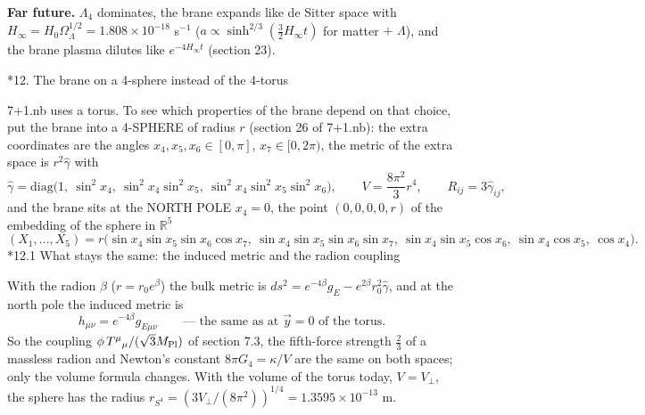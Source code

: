 \documentclass[10pt,a4paper]{article}
\makeatletter
\renewcommand\section{\@startsection{section}{1}{\z@}{-3.5ex \@plus -1ex \@minus -.2ex}{2.3ex \@plus.2ex}{\normalfont\Large\bfseries\raggedright}}
\renewcommand\subsection{\@startsection{subsection}{2}{\z@}{-3.25ex\@plus -1ex \@minus -.2ex}{1.5ex \@plus .2ex}{\normalfont\large\bfseries\raggedright}}
\makeatother
\begin{document}
\textbf{Far future.} $\Lambda_4$ dominates, the brane expands like de Sitter space with $H_\infty=H_0\Omega_\Lambda^{1/2}=1.808\times10^{-18}$ s$^{-1}$ ($a\propto\sinh^{2/3}(\frac32H_\infty t)$ for matter $+$ $\Lambda$), and the brane plasma dilutes like $e^{-4H_\infty t}$ (section 23).

\section*{12. The brane on a 4-sphere instead of the 4-torus}
7+1.nb uses a torus. To see which properties of the brane depend on that choice, put the brane into a 4-SPHERE of radius $r$ (section 26 of 7+1.nb): the extra coordinates are the angles $x_4,x_5,x_6\in[0,\pi]$, $x_7\in[0,2\pi)$, the metric of the extra space is $r^2\hat\gamma$ with
\begin{equation*}
\hat\gamma=\mathrm{diag}\big(1,\ \sin^2x_4,\ \sin^2x_4\sin^2x_5,\ \sin^2x_4\sin^2x_5\sin^2x_6\big),\qquad V=\frac{8\pi^2}3r^4,\qquad R_{ij}=3\hat\gamma_{ij},
\end{equation*}
and the brane sits at the NORTH POLE $x_4=0$, the point $(0,0,0,0,r)$ of the embedding of the sphere in $\mathbb R^5$
\begin{equation*}
(X_1,\dots,X_5)=r\big(\sin x_4\sin x_5\sin x_6\cos x_7,\ \sin x_4\sin x_5\sin x_6\sin x_7,\ \sin x_4\sin x_5\cos x_6,\ \sin x_4\cos x_5,\ \cos x_4\big).
\end{equation*}
\subsection*{12.1 What stays the same: the induced metric and the radion coupling}
With the radion $\beta$ ($r=r_0e^\beta$) the bulk metric is $ds^2=e^{-4\beta}g_E-e^{2\beta}r_0^2\hat\gamma$, and at the north pole the induced metric is
\begin{equation*}
h_{\mu\nu}=e^{-4\beta}g_{E\mu\nu}\qquad\text{— the same as at }\vec y=0\text{ of the torus.}
\end{equation*}
So the coupling $\phi\,T^\mu{}_\mu/(\sqrt3M_{\rm Pl})$ of section 7.3, the fifth-force strength $\frac23$ of a massless radion and Newton’s constant $8\pi G_4=\kappa/V$ are the same on both spaces; only the volume formula changes. With the volume of the torus today, $V=V_\perp$, the sphere has the radius $r_{S^4}=(3V_\perp/(8\pi^2))^{1/4}=1.3595\times10^{-13}$ m.
\end{document}
